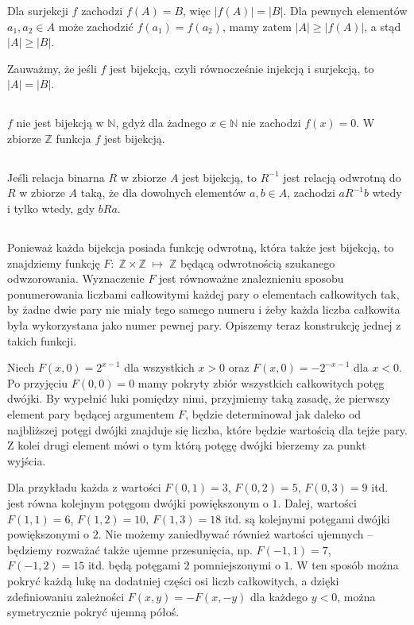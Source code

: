 \subsubsection{}
Dla surjekcji $f$ zachodzi $f(A)=B$, więc $|f(A)|=|B|$. Dla pewnych elementów $a_1,a_2\in A$ może zachodzić $f(a_1)=f(a_2)$, mamy zatem $|A|\ge |f(A)|$, a stąd $|A|\ge |B|$.
\bigskip

\noindent Zauważmy, że jeśli $f$ jest bijekcją, czyli równocześnie injekcją i surjekcją, to $|A|=|B|$.

\subsection{} %
$f$ nie jest bijekcją w $\mathbb{N}$, gdyż dla żadnego $x\in\mathbb{N}$ nie zachodzi $f(x)=0$. W zbiorze $\mathbb{Z}$ funkcja $f$ jest bijekcją.

\subsection{} %
Jeśli relacja binarna $R$ w zbiorze $A$ jest bijekcją, to $R^{-1}$ jest relacją odwrotną do $R$ w zbiorze $A$ taką, że dla dowolnych elementów $a,b\in A$, zachodzi $aR^{-1}b$ wtedy i tylko wtedy, gdy $bRa$.

\subsection{} %
Ponieważ każda bijekcja posiada funkcję odwrotną, która także jest bijekcją, to znajdziemy funkcję $F\!:\;\mathbb{Z}\times\mathbb{Z}\;\mapsto\;\mathbb{Z}$ będącą odwrotnością szukanego odwzorowania. Wyznaczenie $F$ jest równoważne znaleznieniu sposobu ponumerowania liczbami całkowitymi każdej pary o elementach całkowitych tak, by żadne dwie pary nie miały tego samego numeru i żeby każda liczba całkowita była wykorzystana jako numer pewnej pary. Opiszemy teraz konstrukcję jednej z takich funkcji.

Niech $F(x,0)=2^{x-1}$ dla wszystkich $x>0$ oraz $F(x,0)=-2^{-x-1}$ dla $x<0$. Po przyjęciu $F(0,0)=0$ mamy pokryty zbiór wszystkich całkowitych potęg dwójki. By wypełnić luki pomiędzy nimi, przyjmiemy taką zasadę, że pierwszy element pary będącej argumentem $F$, będzie determinował jak daleko od najbliższej potęgi dwójki znajduje się liczba, które będzie wartością dla tejże pary. Z kolei drugi element mówi o tym którą potęgę dwójki bierzemy za punkt wyjścia.

Dla przykładu każda z wartości $F(0,1)=3$, $F(0,2)=5$, $F(0,3)=9$ itd. jest równa kolejnym potęgom dwójki powiększonym o $1$. Dalej, wartości $F(1,1)=6$, $F(1,2)=10$, $F(1,3)=18$ itd. są kolejnymi potęgami dwójki powiększonymi o $2$. Nie możemy zaniedbywać również wartości ujemnych -- będziemy rozważać także ujemne przesunięcia, np. $F(-1,1)=7$, $F(-1,2)=15$ itd. będą potęgami $2$ pomniejszonymi o $1$. W ten sposób można pokryć każdą lukę na dodatniej części osi liczb całkowitych, a dzięki zdefiniowaniu zależności $F(x,y)=-F(x,-y)$ dla każdego $y<0$, można symetrycznie pokryć ujemną półoś.

